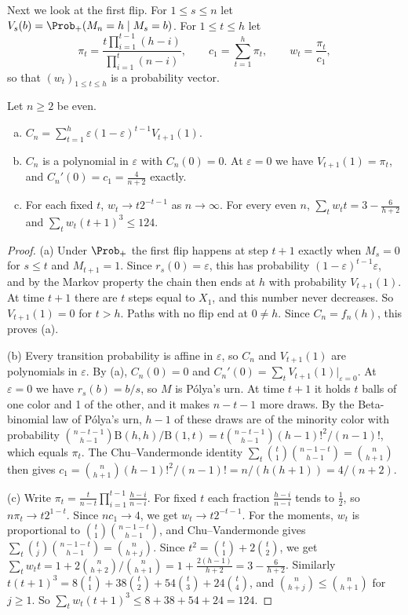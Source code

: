 Next we look at the first flip. For $1\le s\le n$ let
$V_s(b)=\Prob_+(M_n=h\mid M_s=b)$. For $1\le t\le h$ let
\[
 \pi_t=\frac{t\prod_{i=1}^{t-1}(h-i)}{\prod_{i=1}^{t}(n-i)},\qquad
 c_1=\sum_{t=1}^h\pi_t,\qquad w_t=\frac{\pi_t}{c_1},
\]
so that $(w_t)_{1\le t\le h}$ is a probability vector.

\begin{proposition}\label{prop:first-mutation}
Let $n\ge2$ be even.
\begin{enumerate}[(a)]
\item $C_n=\sum_{t=1}^h\varepsilon(1-\varepsilon)^{t-1}V_{t+1}(1)$.
\item $C_n$ is a polynomial in $\varepsilon$ with $C_n(0)=0$. At
$\varepsilon=0$ we have $V_{t+1}(1)=\pi_t$, and
$C_n'(0)=c_1=\frac4{n+2}$ exactly.
\item For each fixed $t$, $w_t\to t2^{-t-1}$ as $n\to\infty$. For every even
$n$, $\sum_tw_tt=3-\frac6{h+2}$ and $\sum_tw_t(t+1)^3\le124$.
\end{enumerate}
\end{proposition}

\begin{proof}
(a) Under $\Prob_+$ the first flip happens at step $t+1$ exactly when
$M_s=0$ for $s\le t$ and $M_{t+1}=1$. Since $r_s(0)=\varepsilon$, this has
probability $(1-\varepsilon)^{t-1}\varepsilon$, and by the Markov property
the chain then ends at $h$ with probability $V_{t+1}(1)$. At time $t+1$
there are $t$ steps equal to $X_1$, and this number never decreases. So
$V_{t+1}(1)=0$ for $t>h$. Paths with no flip end at $0\ne h$. Since
$C_n=f_n(h)$, this proves (a).

(b) Every transition probability is affine in $\varepsilon$, so $C_n$ and
$V_{t+1}(1)$ are polynomials in $\varepsilon$. By (a), $C_n(0)=0$ and
$C_n'(0)=\sum_tV_{t+1}(1)|_{\varepsilon=0}$. At $\varepsilon=0$ we have
$r_s(b)=b/s$, so $M$ is P\'olya's urn. At time $t+1$ it holds $t$ balls of
one color and 1 of the other, and it makes $n-t-1$ more draws. By the
Beta-binomial law of P\'olya's urn, $h-1$ of these draws are of the
minority color with probability
$\binom{n-t-1}{h-1}\mathrm B(h,h)/\mathrm B(1,t)=t\binom{n-t-1}{h-1}(h-1)!^2/(n-1)!$,
which equals $\pi_t$. The Chu--Vandermonde identity
$\sum_t\binom t1\binom{n-1-t}{h-1}=\binom n{h+1}$ then gives
$c_1=\binom n{h+1}(h-1)!^2/(n-1)!=n/(h(h+1))=4/(n+2)$.

(c) Write $\pi_t=\frac t{n-t}\prod_{i=1}^{t-1}\frac{h-i}{n-i}$. For fixed
$t$ each fraction $\frac{h-i}{n-i}$ tends to $\frac12$, so
$n\pi_t\to t2^{1-t}$. Since $nc_1\to4$, we get $w_t\to t2^{-t-1}$. For the
moments, $w_t$ is proportional to $\binom t1\binom{n-1-t}{h-1}$, and
Chu--Vandermonde gives $\sum_t\binom tj\binom{n-1-t}{h-1}=\binom n{h+j}$.
Since $t^2=\binom t1+2\binom t2$, we get
$\sum_tw_tt=1+2\binom n{h+2}/\binom n{h+1}=1+\frac{2(h-1)}{h+2}=3-\frac6{h+2}$.
Similarly $t(t+1)^3=8\binom t1+38\binom t2+54\binom t3+24\binom t4$, and
$\binom n{h+j}\le\binom n{h+1}$ for $j\ge1$. So
$\sum_tw_t(t+1)^3\le8+38+54+24=124$.
\end{proof}

